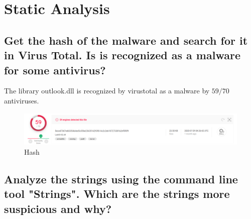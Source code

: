 \documentclass[12pt,letter]{article} %
\begin{document}
    \title{\rmfamily{}}
    \author{{Juan Esteban Murcia y Rodrigo Castillo}}
    \date{\today}

    \maketitle



    \section{Static Analysis}
        \subsection{Get the hash of the malware and search for it in Virus
            Total. Is is recognized as a malware for some antivirus?}
                The library outlook.dll is recognized by virustotal as a malware by
                $ 59/70  $ antiviruses.
                \begin{figure}[h]
                    \centering
                    \includegraphics[width=0.8\linewidth]{hash.png}
                    \caption{Hash}
                    \label{hash}
                \end{figure}

        \subsection{Analyze the strings using the command line tool "Strings".
        Which are the strings more suspicious and why?}
\end{document}
